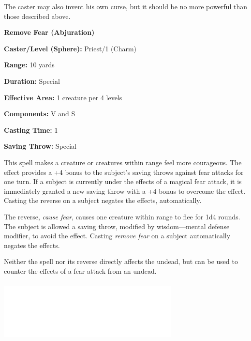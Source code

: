 \begin{multicols}{2}
The caster may also invent his own curse, but it should be no more powerful than those described above. 

\vspace{1em}

\noindent
\begin{minipage}{\columnwidth}

\noindent \textbf{Remove Fear (Abjuration)}

\noindent \textbf{Caster/Level (Sphere):} Priest/1 (Charm)

\noindent \textbf{Range:} 10 yards

\noindent \textbf{Duration:} Special

\noindent \textbf{Effective Area:} 1 creature per 4 levels

\noindent \textbf{Components:} V and S

\noindent \textbf{Casting Time:} 1

\noindent \textbf{Saving Throw:} Special

\end{minipage}

This spell makes a creature or creatures within range feel more courageous.  The effect provides a +4 bonus to the subject's saving throws against fear attacks for one turn.  If a subject is currently under the effects of a magical fear attack, it is immediately granted a new saving throw with a +4 bonus to overcome the effect.  Casting the reverse on a subject negates the effects, automatically.

The reverse, \textit{cause fear}, causes one creature within range to flee for 1d4 rounds.  The subject is allowed a saving throw, modified by wisdom---mental defense modifier, to avoid the effect.  Casting \textit{remove fear} on a subject automatically negates the effects.

Neither the spell nor its reverse directly affects the undead, but can be used to counter the effects of a fear attack from an undead.

\noindent\includegraphics[width=3.6in, height=1.25in]{testblock.pdf}

\vspace{1em}


\end{multicols}
